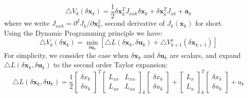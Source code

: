 \begin{equation}
    \triangle V_k(\delta \mathbf{x}_k) = \frac{1}{2} \delta \mathbf{x}_k^T J_{xxk} \delta \mathbf{x}_k + \delta \mathbf{x}_k^T J_{xk} + \mathbf{a}_k
\end{equation}
where we write $ J_{xxk} = \partial^2 J_k/ \partial \mathbf{x}_k ^2$, second derivative of $J_k (\mathbf{x}_k)$ for short. \\
Using the Dynamic Programming principle we have:
\begin{equation}
   \triangle V_k(\delta \mathbf{x}_k) = \min_{\delta \mathbf{u}_k} \left[ \triangle L(\delta \mathbf{x}_k, \delta \mathbf{u}_k) + \triangle V^o_{k+1}(\delta \mathbf{x}_{k+1})\right]
\end{equation}
For simplicity, we consider the case when $\delta \mathbf{x}_k$ and $\delta \mathbf{u}_k$ are scalars, and expand $\triangle L(\delta \mathbf{x}_k, \delta \mathbf{u}_k)$ to the second order Taylor expansion:
\begin{equation}
    \triangle L(\delta \mathbf{x}_k, \delta \mathbf{u}_k) = \frac{1}{2} \begin{bmatrix}
    \delta x_k\\
    \delta u_k
    \end{bmatrix}^T
    \begin{bmatrix}
    L_{xx} & L_{xu}\\
    L_{ux} & L_{uu}
    \end{bmatrix}_k
    \begin{bmatrix}
    \delta x_k\\
    \delta u_k
    \end{bmatrix} + 
    \begin{bmatrix}
    L_{x}\\
    L_{u}
    \end{bmatrix}_k^T
    \begin{bmatrix}
    \delta x_k\\
    \delta u_k
    \end{bmatrix} + a_k
\end{equation}